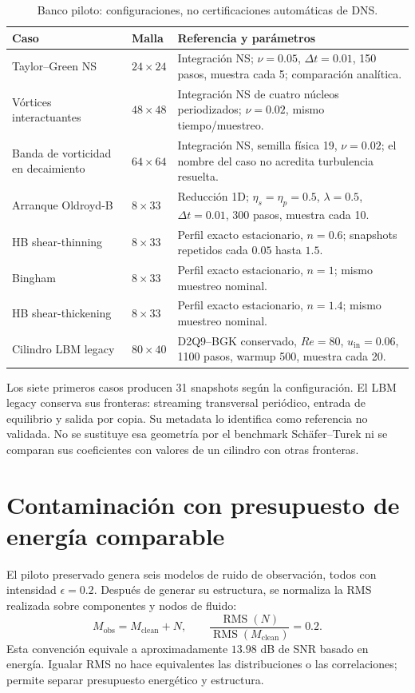 \documentclass[11pt,oneside,openany]{book}
\DeclareMathOperator{\RMS}{RMS}
\begin{document}
\begin{table}[htbp]
\centering\small
\caption{Banco piloto: configuraciones, no certificaciones automáticas de DNS.}
\label{tab:cases}
\begin{tabular}{@{}p{3.8cm}p{1.7cm}p{7.8cm}@{}}
\toprule
Caso & Malla & Referencia y parámetros\\
\midrule
Taylor--Green NS & $24\times24$ & Integración NS; $\nu=0.05$, $\Delta t=0.01$,
  150 pasos, muestra cada 5; comparación analítica.\\
Vórtices interactuantes & $48\times48$ & Integración NS de cuatro núcleos
  periodizados; $\nu=0.02$, mismo tiempo/muestreo.\\
Banda de vorticidad en decaimiento & $64\times64$ & Integración NS,
  semilla física 19, $\nu=0.02$; el nombre del caso no acredita turbulencia resuelta.\\
Arranque Oldroyd-B & $8\times33$ & Reducción 1D; $\eta_s=\eta_p=0.5$,
  $\lambda=0.5$, $\Delta t=0.01$, 300 pasos, muestra cada 10.\\
HB shear-thinning & $8\times33$ & Perfil exacto estacionario,
  $n=0.6$; snapshots repetidos cada $0.05$ hasta $1.5$.\\
Bingham & $8\times33$ & Perfil exacto estacionario, $n=1$;
  mismo muestreo nominal.\\
HB shear-thickening & $8\times33$ & Perfil exacto estacionario,
  $n=1.4$; mismo muestreo nominal.\\
Cilindro LBM legacy & $80\times40$ & D2Q9--BGK conservado,
  $Re=80$, $u_{\mathrm{in}}=0.06$, 1100 pasos,
  warmup 500, muestra cada 20.\\
\bottomrule
\end{tabular}
\end{table}

Los siete primeros casos producen 31 snapshots según la configuración.
El LBM legacy conserva sus fronteras: streaming transversal periódico,
entrada de equilibrio y salida por copia. Su metadata lo identifica como
referencia no validada. No se sustituye esa geometría por el benchmark
Schäfer--Turek \citep{schaefer1996cylinder} ni se comparan sus coeficientes
con valores de un cilindro con otras fronteras.

\section{Contaminación con presupuesto de energía comparable}
El piloto preservado genera seis modelos de ruido de observación, todos con intensidad
$\epsilon=0.2$. Después de generar su estructura, se normaliza la RMS
realizada sobre componentes y nodos de fluido:
\begin{equation}
 M_{\mathrm{obs}}=M_{\mathrm{clean}}+N,\qquad
 \frac{\RMS(N)}{\RMS(M_{\mathrm{clean}})}=0.2.
\end{equation}
Esta convención equivale a aproximadamente $13.98$ dB de SNR basado en
energía. Igualar RMS no hace equivalentes las distribuciones o las
correlaciones; permite separar presupuesto energético y estructura.
\end{document}

